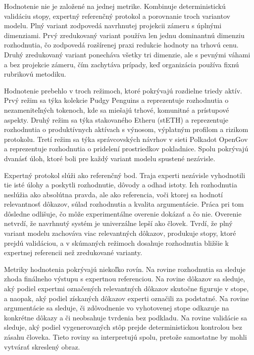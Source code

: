Hodnotenie nie je založené na jednej metrike. Kombinuje deterministickú validáciu stopy, expertný referenčný protokol a porovnanie troch variantov modelu. Plný variant zodpovedá navrhnutej projekcii zámeru s úplnými dimenziami. Prvý zredukovaný variant používa len jednu dominantnú dimenziu rozhodnutia, čo zodpovedá rozšírenej praxi redukcie hodnoty na trhovú cenu. Druhý zredukovaný variant ponecháva všetky tri dimenzie, ale s pevnými váhami a bez projekcie zámeru, čím zachytáva prípady, keď organizácia používa fixnú rubrikovú metodiku.

Hodnotenie prebehlo v troch režimoch, ktoré pokrývajú rozdielne triedy aktív. Prvý režim sa týka kolekcie Pudgy Penguins a reprezentuje rozhodnutia o nezameniteľných tokenoch, kde sa miešajú trhové, komunitné a prístupové aspekty. Druhý režim sa týka stakovaného Etheru (stETH) a reprezentuje rozhodnutia o produktívnych aktívach s výnosom, výplatným profilom a rizikom protokolu. Tretí režim sa týka správcovských návrhov v sieti Polkadot OpenGov a reprezentuje rozhodnutia o pridelení prostriedkov pokladnice. Spolu pokrývajú dvanásť úloh, ktoré boli pre každý variant modelu spustené nezávisle.

Expertný protokol slúži ako referenčný bod. Traja experti nezávisle vyhodnotili tie isté úlohy a poskytli rozhodnutie, dôvody a odhad istoty. Ich rozhodnutia neslúžia ako absolútna pravda, ale ako referencia, voči ktorej sa hodnotí relevantnosť dôkazov, súlad rozhodnutia a kvalita argumentácie. Práca pri tom dôsledne odlišuje, čo môže experimentálne overenie dokázať a čo nie. Overenie netvrdí, že navrhnutý systém je univerzálne lepší ako človek. Tvrdí, že plný variant modelu zachováva viac relevantných dôkazov, produkuje stopy, ktoré prejdú validáciou, a v skúmaných režimoch dosahuje rozhodnutia bližšie k expertnej referencii než zredukované varianty.

Metriky hodnotenia pokrývajú niekoľko rovín. Na rovine rozhodnutia sa sleduje zhoda finálneho výstupu s expertnou referenciou. Na rovine dôkazov sa sleduje, aký podiel expertmi označených relevantných dôkazov skutočne figuruje v stope, a naopak, aký podiel získaných dôkazov experti označili za podstatné. Na rovine argumentácie sa sleduje, či zdôvodnenie vo vyhotovenej stope odkazuje na konkrétne dôkazy a či neobsahuje tvrdenia bez podkladu. Na rovine validácie sa sleduje, aký podiel vygenerovaných stôp prejde deterministickou kontrolou bez zásahu človeka. Tieto roviny sa interpretujú spolu, pretože samostatne by mohli vytvárať skreslený obraz.

